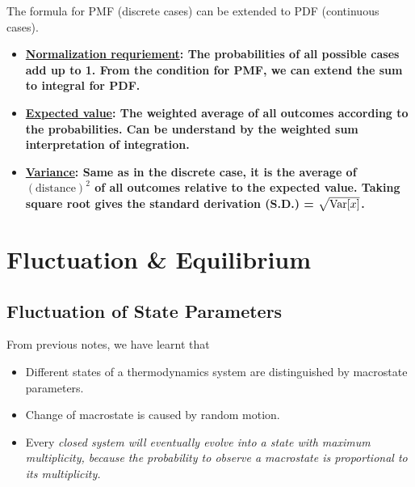 \documentclass[class=article, crop=false, 12pt]{standalone}
\begin{document}
\newpage
The formula for PMF (discrete cases) can be extended to PDF (continuous cases).
\begin{itemize}
    \item \bf{\ul{Normalization requriement}}: 
    The probabilities of all possible cases add up to 1.
    From the condition for PMF, we can extend the sum to integral for PDF.

    \item \bf{\ul{Expected value}}: 
    The weighted average of all outcomes according to the probabilities.
    Can be understand by the weighted sum interpretation of integration.

    \item \bf{\ul{Variance}}:
    Same as in the discrete case, it is the average of $(\text{distance})^2$ of all outcomes relative to the expected value.
    Taking square root gives the standard derivation (S.D.) = $\sqrt{\Var{x}}$. 

\end{itemize}


\linesep
\section{Fluctuation \& Equilibrium}

\subsection{Fluctuation of State Parameters}

From previous notes, we have learnt that 
\begin{itemize}
    \item Different states of a thermodynamics system are distinguished by macrostate parameters.
    \item Change of macrostate is caused by random motion. 
    \item Every \it{closed} system will eventually evolve into a state with maximum multiplicity, 
    because the probability to observe a macrostate is proportional to its multiplicity.
\end{itemize}
\end{document}
